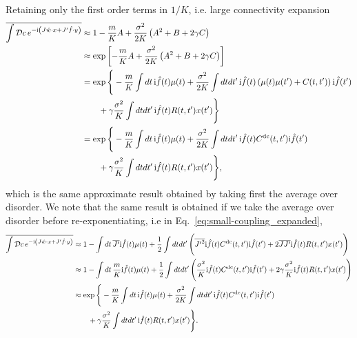\documentclass[
    preprint,
    linenumbers,
    amsmath,amssymb,amsfonts,
    aps, physrev,
    superscriptaddress,
    10pt,
    bibnotes
    ]{revtex4-2}
\begin{document}
Retaining only the first order terms in $1/K$, i.e. large connectivity expansion
\begin{align}
    \overline{\int \mathcal{D}c \, e^{-{\rm i}\left(J \hat{w}\cdot x+J'\hat{f}\cdot y\right)}} & \approx 1 - \frac{m}{K}A + \frac{\sigma^2}{2K}\left(A^2+B+2\gamma C\right)\\
    &\approx \exp\left[- \frac{m}{K}A + \frac{\sigma^2}{2K}\left(A^2+B+2\gamma C\right)\right]\\
    &=\exp \Bigg\{ -\frac{m}{K}\int dt\, {\rm i}\hat{f}(t)\mu(t)+\frac{\sigma^2}{2K}\int dtdt'\, {\rm i}\hat{f}(t)\left(\mu(t)\mu(t')+C(t,t')\right){\rm i}\hat{f}(t')\nonumber\\
    &\qquad + \gamma\frac{\sigma^2}{K}\int dt dt'\, {\rm i}\hat{f}(t)R(t,t')x(t')\Bigg\}\\
    &=\exp \Bigg\{ -\frac{m}{K}\int dt\, {\rm i}\hat{f}(t)\mu(t)+\frac{\sigma^2}{2K}\int dtdt'\, {\rm i}\hat{f}(t)C^{\rm dc}(t,t'){\rm i}\hat{f}(t')\nonumber\\
    &\qquad + \gamma\frac{\sigma^2}{K}\int dt dt'\, {\rm i}\hat{f}(t)R(t,t')x(t')\Bigg\},
\end{align}
which is the same approximate result obtained by taking first the average over disorder. We note that the same result is obtained if we take the average over disorder before re-exponentiating, i.e in Eq.~\eqref{eq:small-coupling_expanded}, 
\begin{align}
    \overline{\int \mathcal{D}c \, e^{-{\rm i}\left(J \hat{w}\cdot x+J'\hat{f}\cdot y\right)}} & \approx 1 - \int dt\, \overline{J'} {\rm i} \hat{f}(t) \mu(t) + \frac{1}{2}\int dt dt' \, \Bigg(\overline{{J'}^2} {\rm i}\hat{f}(t)C^{\rm dc}(t,t'){\rm i}\hat{f}(t') + 2\overline{JJ'} {\rm i}\hat{f}(t) R(t,t') x(t')\Bigg)\\
    &\approx 1 - \int dt\, \frac{m}{K} {\rm i} \hat{f}(t) \mu(t) + \frac{1}{2}\int dt dt' \, \Bigg(\frac{\sigma^2}{K} {\rm i}\hat{f}(t)C^{\rm dc}(t,t'){\rm i}\hat{f}(t') + 2\gamma\frac{\sigma^2}{K} {\rm i}\hat{f}(t) R(t,t') x(t')\Bigg)\\
    &\approx \exp \Bigg\{ -\frac{m}{K}\int dt\, {\rm i}\hat{f}(t)\mu(t)+\frac{\sigma^2}{2K}\int dtdt'\, {\rm i}\hat{f}(t)C^{\rm dc}(t,t'){\rm i}\hat{f}(t')\nonumber\\
    &\qquad + \gamma\frac{\sigma^2}{K}\int dt dt'\, {\rm i}\hat{f}(t)R(t,t')x(t')\Bigg\}.
\end{align}
\end{document}
